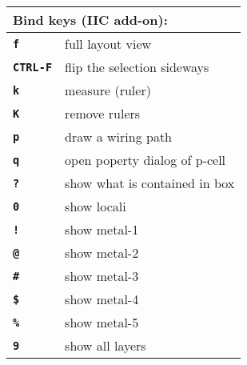 \documentclass[10pt,a4paper]{article}
\newcommand{\key}[1]{\texttt{\textbf{#1}}}
\begin{document}
        \begin{tabular}{p{}p{}}
                \toprule
		\multicolumn{2}{l}{Bind keys (IIC add-on):}\\
                \midrule
                \key{f} & full layout view\\
                \key{CTRL-F} & flip the selection sideways\\
                \key{k} & measure (ruler)\\
                \key{K} & remove rulers\\
                \key{p} & draw a wiring path\\
                \key{q} & open poperty dialog of p-cell\\
                \key{?} & show what is contained in box\\
                \key{0} & show locali\\
                \key{!} & show metal-1\\
                \key{@} & show metal-2\\
                \key{\#} & show metal-3\\
                \key{\$} & show metal-4\\
                \key{\%} & show metal-5\\
                \key{9} & show all layers\\
                \bottomrule
        \end{tabular}

	\newpage
\end{document}
